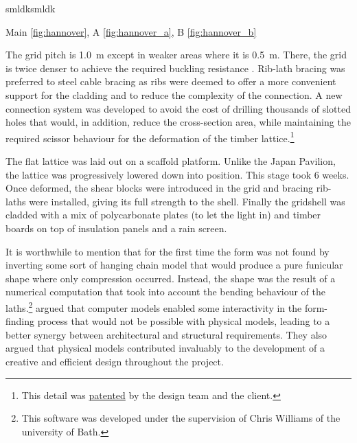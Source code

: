 smldksmldk

Main \cref{fig:hannover}, A \ref{fig:hannover_a}, B \ref{fig:hannover_b} 



The grid pitch is \SI{1.0}{m} except in weaker areas where it is \SI{0.5}{m}. There, the grid is twice denser to achieve the required buckling resistance \cite{Harris2003}. Rib-lath bracing was preferred to steel cable bracing as ribs were deemed to offer a more convenient support for the cladding and to reduce the complexity of the connection. A new connection system was developed to avoid the cost of drilling thousands of slotted holes that would, in addition, reduce the cross-section area, while maintaining the required scissor behaviour for the deformation of the timber lattice.\footnote{This detail was \href{https://patents.google.com/patent/GB2361504A/en?q=\%22A+coupling+and+a+method+of+constructing+grid+shell+buildings+using+such+a+coupling\%22&country=GB}{patented} by the design team and the client.}

The flat lattice was laid out on a scaffold platform. Unlike the Japan Pavilion, the lattice was progressively lowered down into position. This stage took 6 weeks. Once deformed, the shear blocks were introduced in the grid and bracing rib-laths were installed, giving its full strength to the shell. Finally the gridshell was cladded with a mix of polycarbonate plates (to let the light in) and timber boards on top of insulation panels and a rain screen.

It is worthwhile to mention that for the first time the form was not found by inverting some sort of hanging chain model that would produce a pure funicular shape where only compression occurred. Instead, the shape was the result of a numerical computation that took into account the bending behaviour of the laths.\footnote{This software was developed under the supervision of Chris Williams of the university of Bath.} \citet{Harris2003} argued that computer models enabled some interactivity in the form-finding process that would not be possible with physical models, leading to a better synergy between architectural and structural requirements. They also argued that physical models contributed invaluably to the development of a creative and efficient design throughout the project.

